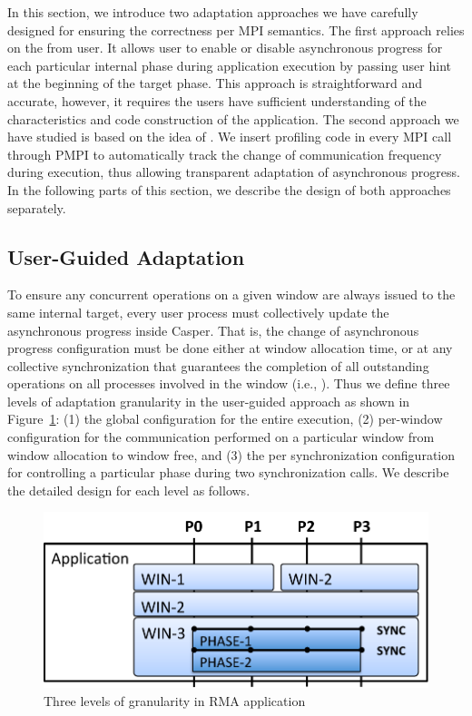 In this section, we introduce two adaptation approaches we have carefully
designed for ensuring the correctness per MPI semantics.
The first approach relies on the  from user. It allows
user to enable or disable asynchronous progress for each particular
internal phase during application execution by passing user hint at
the beginning of the target phase. This approach is straightforward
and accurate, however, it requires the users have sufficient understanding
of the characteristics and code construction of the application.
The second approach we have studied is based on the idea of
. We insert profiling code in every MPI call through
PMPI to automatically track the change of communication frequency during
execution, thus allowing transparent adaptation of asynchronous progress.
In the following parts of this section, we describe the design of both
approaches separately.

\subsection{User-Guided Adaptation}\label{sec:des-adpt-user}
To ensure any concurrent operations on a given window are always
issued to the same internal target, every user process must collectively
update the asynchronous progress inside Casper. That is, the change
of asynchronous progress configuration must be done either at window
allocation time, or at any collective synchronization that guarantees
the completion of all outstanding operations on all processes involved
in the window (i.e., ). Thus we define three levels of
adaptation granularity in the user-guided approach as shown in
Figure~\ref{fig:deg-adpt-gran}: (1) the global configuration for
the entire execution, (2) per-window configuration for the communication
performed on a particular window from window allocation to window free,
and (3) the per synchronization configuration for controlling a particular
phase during two synchronization calls. We describe the detailed design
for each level as follows.

\begin{figure}
\centering
\includegraphics[width=0.8\columnwidth]{figures/adpt-casper/design_adpt_granularity.pdf}
\caption{Three levels of granularity in RMA application}
\label{fig:deg-adpt-gran}
\end{figure}

